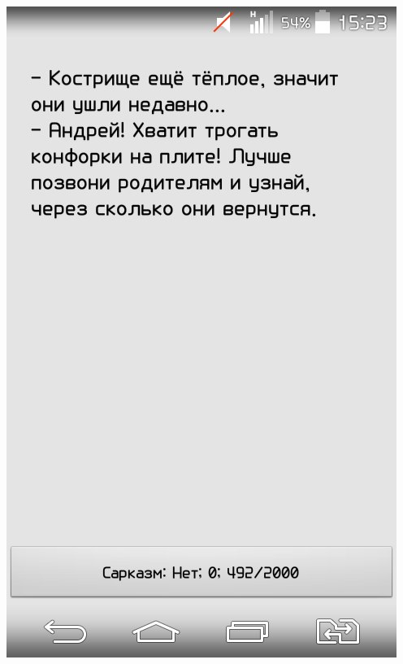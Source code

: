 \documentclass[t]{beamer}
\begin{document}
\begin{frame}
{		\includegraphics[scale = 0.17]{images/Bash2.jpg}
}
\end{frame}
\end{document}
